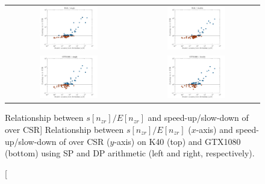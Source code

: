 \begin{figure}[t]
\begin{tabular}{cc}
\includegraphics[width=0.48\textwidth]{plots/std_speedup_K40_single.pdf} &
\includegraphics[width=0.48\textwidth]{plots/std_speedup_K40_double.pdf}\\
\includegraphics[width=0.48\textwidth]{plots/std_speedup_GTX1080_single.pdf} &
\includegraphics[width=0.48\textwidth]{plots/std_speedup_GTX1080_double.pdf}
\end{tabular}
\caption
    [{Relationship between $s[n_{zr}]/E[n_{zr}]$
    and speed-up/slow-down of \bcsr over CSR}]
    {Relationship between $s[n_{zr}]/E[n_{zr}]$ ($x$-axis)
    and speed-up/slow-down of \bcsr over CSR ($y$-axis)
    on K40 (top) and GTX1080 (bottom)
    using SP and DP arithmetic (left and right, respectively).}
\label{2017-csr-spmv:fig:deviation}
\end{figure}

